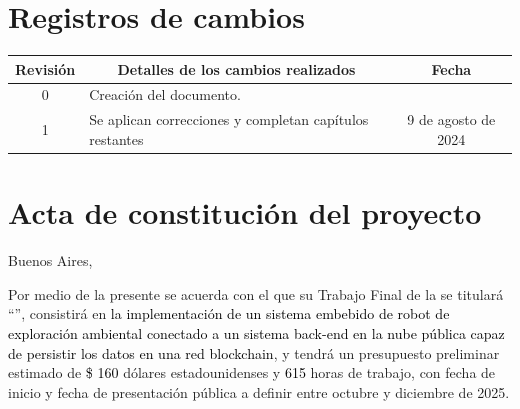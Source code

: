 \documentclass[
11pt, %
]{charter}
\begin{document}
\maketitle
\thispagestyle{empty}
\pagebreak


\thispagestyle{empty}
{\setlength{\parskip}{0pt}
\tableofcontents{}
}
\pagebreak


\section*{Registros de cambios}
\label{sec:registro}


\begin{table}[ht]
\label{tab:registro}
\centering
\begin{tabularx}{\linewidth}{@{}|c|X|c|@{}}
\hline
\rowcolor[HTML]{C0C0C0}
Revisión & \multicolumn{1}{c|}{\cellcolor[HTML]{C0C0C0}Detalles de los cambios realizados} & Fecha      \\ \hline
0      & Creación del documento.                                 								&\fechaInicioName \\ \hline
1      & Se aplican correcciones y completan capítulos restantes								& 9 de agosto de 2024 \\ \hline

\end{tabularx}
\end{table}

\pagebreak



\section*{Acta de constitución del proyecto}
\label{sec:acta}

\begin{flushright}
Buenos Aires, \fechaInicioName
\end{flushright}

\vspace{2cm}

Por medio de la presente se acuerda con el \authorname\hspace{1px} que su Trabajo Final de la \degreename\hspace{1px} se titulará ``\ttitle'', consistirá en \textcolor{black}{la implementación de un sistema embebido de robot de exploración ambiental conectado a un sistema back-end en la nube pública capaz de persistir los datos en una red blockchain}, y tendrá un presupuesto preliminar estimado de \textcolor{black}{\$ 160} dólares estadounidenses y \textcolor{black}{615} horas de trabajo, con fecha de inicio \fechaInicioName\hspace{1px} y fecha de presentación pública a definir entre octubre y diciembre de 2025.
\end{document}
